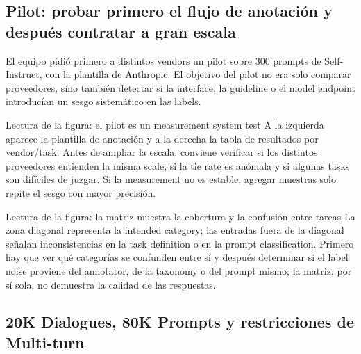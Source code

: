 
\subsection{Pilot: probar primero el flujo de anotación y después contratar a gran escala}

El equipo pidió primero a distintos vendors un pilot sobre 300 prompts de Self-Instruct, con la plantilla de Anthropic. El objetivo del pilot no era solo comparar proveedores, sino también detectar si la interface, la guideline o el model endpoint introducían un sesgo sistemático en las labels.


\begin{knowledgebox}{Lectura de la figura: el pilot es un measurement system test}
A la izquierda aparece la plantilla de anotación y a la derecha la tabla de resultados por vendor/task. Antes de ampliar la escala, conviene verificar si los distintos proveedores entienden la misma scale, si la tie rate es anómala y si algunas tasks son difíciles de juzgar. Si la measurement no es estable, agregar muestras solo repite el sesgo con mayor precisión.
\end{knowledgebox}


\begin{knowledgebox}{Lectura de la figura: la matriz muestra la cobertura y la confusión entre tareas}
La zona diagonal representa la intended category; las entradas fuera de la diagonal señalan inconsistencias en la task definition o en la prompt classification. Primero hay que ver qué categorías se confunden entre sí y después determinar si el label noise proviene del annotator, de la taxonomy o del prompt mismo; la matriz, por sí sola, no demuestra la calidad de las respuestas.
\end{knowledgebox}

\subsection{20K Dialogues, 80K Prompts y restricciones de Multi-turn}

